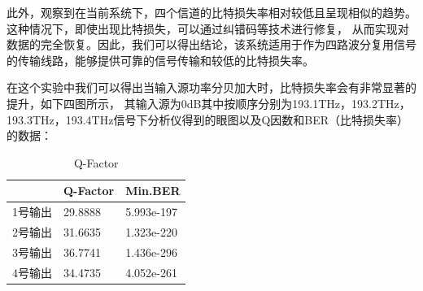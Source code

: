\documentclass[12pt]{article}
\begin{document}
此外，观察到在当前系统下，四个信道的比特损失率相对较低且呈现相似的趋势。这种情况下，即使出现比特损失，可以通过纠错码等技术进行修复，
从而实现对数据的完全恢复。因此，我们可以得出结论，该系统适用于作为四路波分复用信号的传输线路，能够提供可靠的信号传输和较低的比特损失率。

在这个实验中我们可以得出当输入源功率分贝加大时，比特损失率会有非常显著的提升，如下四图所示，
其输入源为0dB其中按顺序分别为193.1THz，193.2THz，193.3THz，193.4THz信号下分析仪得到的眼图以及Q因数和BER（比特损失率）的数据：
\begin{table}[H]
  \centering
  \caption{Q-Factor}
  \begin{tabular}{|l|l|l|} 
  \hline
    & Q-Factor & Min.BER    \\ 
  \hline
  1号输出 & 29.8888  & 5.993e-197  \\ 
  \hline
  2号输出 & 31.6635  & 1.323e-220  \\ 
  \hline
  3号输出 & 36.7741   & 1.436e-296  \\ 
  \hline
  4号输出 & 34.4735  & 4.052e-261  \\
  \hline
  \end{tabular}
  \end{table}
\end{document}
